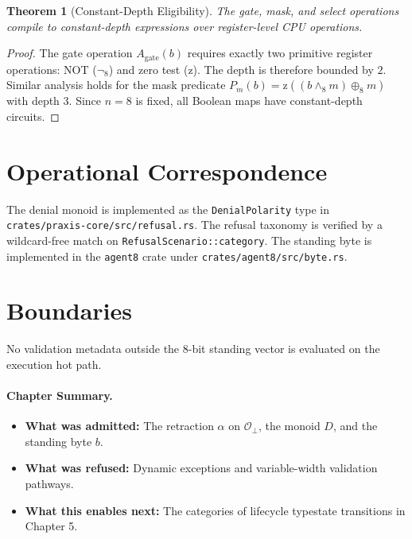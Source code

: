 \documentclass[11pt,oneside]{book}
\theoremstyle{definition}
\theoremstyle{plain}
\newtheorem{theorem}{Theorem}[chapter]
\theoremstyle{remark}
\newcommand{\Obs}{\mathcal{O}}                 %
\newcommand{\Obsbot}{\Obs_{\bot}}             %
\newcommand{\code}[1]{\texttt{#1}}
\begin{document}
\begin{theorem}[Constant-Depth Eligibility]\label{thm:constant_depth}
The gate, mask, and select operations compile to constant-depth expressions over register-level CPU operations. %
\end{theorem}

\begin{proof}
The gate operation $A_{\text{gate}}(b)$ requires exactly two primitive register operations: NOT ($\neg_8$) and zero test ($\text{z}$). %
The depth is therefore bounded by $2$. %
Similar analysis holds for the mask predicate $P_m(b) = \text{z}((b \wedge_8 m) \oplus_8 m)$ with depth $3$. %
Since $n=8$ is fixed, all Boolean maps have constant-depth circuits. %
\end{proof}

\section{Operational Correspondence}
The denial monoid is implemented as the \code{DenialPolarity} type in \code{crates/praxis-core/src/refusal.rs}. %
The refusal taxonomy is verified by a wildcard-free match on \code{RefusalScenario::category}. %
The standing byte is implemented in the \code{agent8} crate under \code{crates/agent8/src/byte.rs}. %

\section{Boundaries}
No validation metadata outside the 8-bit standing vector is evaluated on the execution hot path. %

\paragraph{Chapter Summary.}
\begin{itemize}
  \item \textbf{What was admitted:} The retraction $\alpha$ on $\Obsbot$, the monoid $D$, and the standing byte $b$. %
  \item \textbf{What was refused:} Dynamic exceptions and variable-width validation pathways. %
  \item \textbf{What this enables next:} The categories of lifecycle typestate transitions in Chapter 5. %
\end{itemize}
\end{document}
